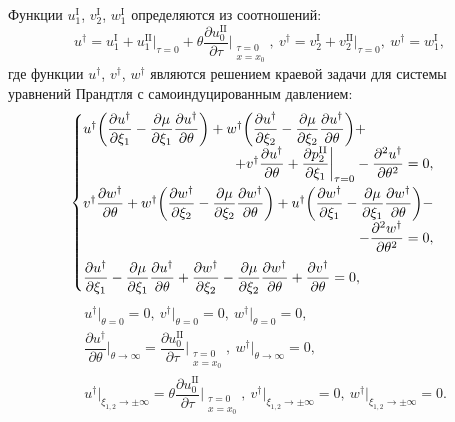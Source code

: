 \documentclass[../master.tex]{subfiles}
\begin{document}
Функции $u_1^{\text{I}}$, $v_2^{\text{I}}$, $w_1^{\text{I}}$ определяются из соотношений:
\[
 u^{\dagger} = u_1^{\text{I}} + u_1^{\text{II}}\big|_{ \tau=0} + \theta\dfrac{\partial u_0^{\text{II}}}{\partial \tau}\bigg|_{{\begin{smallmatrix} \tau=0 \\ x=x_0 \end{smallmatrix}}}, \
 v^{\dagger} = v_2^{\text{I}} + v_2^{\text{II}}\big|_{\tau=0}, \
 w^{\dagger} = w_1^{\text{I}},
\]
где функции $u^\dagger$, $v^\dagger$, $w^\dagger$ являются решением краевой задачи для системы уравнений Прандтля с самоиндуцированным давлением:
\begin{equation*}
\begin{cases}
u^{\dagger}\bigg(\dfrac{\partial u^{\dagger}}{\partial\xi_1} - \dfrac{\partial \mu}{\partial\xi_1}\dfrac{\partial u^{\dagger}}{\partial\theta} \bigg)+ w^{\dagger}\bigg(\dfrac{\partial u^{\dagger}}{\partial\xi_2} - \dfrac{\partial \mu}{\partial\xi_2}\dfrac{\partial u^{\dagger}}{\partial\theta} \bigg) + \\ 
\quad \hfill +v^{\dagger}\dfrac{\partial u^{\dagger}}{\partial\theta} + \dfrac{\partial p_2^{\text{II}}}{\partial \xi_1}\bigg|_{\tau=0} -  \dfrac{\partial^2u^{\dagger}}{\partial\theta^2} =0, 
\\[2ex]
 v^{\dagger}\dfrac{\partial w^{\dagger}}{\partial\theta} + w^{\dagger} \bigg(\dfrac{\partial w^{\dagger}}{\partial\xi_2} - \dfrac{\partial \mu}{\partial\xi_2}\dfrac{\partial w^{\dagger}}{\partial\theta} \bigg) + u^{\dagger} \bigg(\dfrac{\partial w^{\dagger}}{\partial\xi_1} - \dfrac{\partial \mu}{\partial\xi_1}\dfrac{\partial w^{\dagger}}{\partial\theta} \bigg)-\\ \quad \hfill - \dfrac{\partial^2 w^\dagger}{\partial \theta^2}= 0,
 \\[2ex]
\dfrac{\partial u^{\dagger}}{\partial\xi_1} - \dfrac{\partial \mu}{\partial\xi_1}\dfrac{\partial u^{\dagger}}{\partial\theta} + \dfrac{\partial w^{\dagger}}{\partial\xi_2} - \dfrac{\partial \mu}{\partial\xi_2}\dfrac{\partial w^{\dagger}}{\partial\theta} + \dfrac{\partial v^{\dagger}}{\partial \theta} = 0,
\end{cases}
\end{equation*}
\begin{align*}
&u^{\dagger} \big|_{\theta=0} = 0,\
v^{\dagger} \big|_{\theta=0} = 0, \
w^{\dagger} \big|_{\theta=0} = 0,\\
&\dfrac{\partial u^{\dagger}}{\partial \theta}\bigg|_{\theta \rightarrow \infty} = \dfrac{\partial u_0^{\text{II}}}{\partial \tau}\bigg|_{\begin{smallmatrix} \tau=0\\ x=x_0   \end{smallmatrix}}, \
w^{\dagger} \big|_{\theta\to \infty} =0,\\
&u^{\dagger} \big|_{\xi_{1,2} \rightarrow \pm \infty} = \theta \dfrac{\partial u_0^{\text{II}}}{\partial \tau}\bigg|_{{\begin{smallmatrix} \tau=0\\ x=x_0  \end{smallmatrix}}}, \
v^{\dagger} \big|_{\xi_{1,2} \rightarrow \pm \infty} =0,\
w^{\dagger} \big|_{\xi_{1,2} \rightarrow \pm \infty} =0.
\end{align*}
\end{document}
